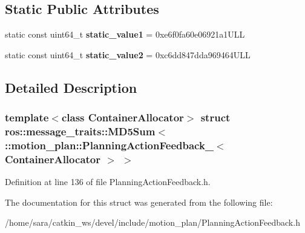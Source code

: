 \subsection*{Static Public Attributes}
\begin{DoxyCompactItemize}
\item 
\mbox{\label{structros_1_1message__traits_1_1MD5Sum_3_01_1_1motion__plan_1_1PlanningActionFeedback___3_01ContainerAllocator_01_4_01_4_a2917988d8db2eae40ac3e131e1578331}} 
static const uint64\+\_\+t {\bfseries static\+\_\+value1} = 0xe6f0fa60e06921a1\+U\+LL
\item 
\mbox{\label{structros_1_1message__traits_1_1MD5Sum_3_01_1_1motion__plan_1_1PlanningActionFeedback___3_01ContainerAllocator_01_4_01_4_a125222966262b7d71c6dc44e0a1192fc}} 
static const uint64\+\_\+t {\bfseries static\+\_\+value2} = 0xc6dd847dda969464\+U\+LL
\end{DoxyCompactItemize}


\subsection{Detailed Description}
\subsubsection*{template$<$class Container\+Allocator$>$\newline
struct ros\+::message\+\_\+traits\+::\+M\+D5\+Sum$<$ \+::motion\+\_\+plan\+::\+Planning\+Action\+Feedback\+\_\+$<$ Container\+Allocator $>$ $>$}



Definition at line 136 of file Planning\+Action\+Feedback.\+h.



The documentation for this struct was generated from the following file\+:\begin{DoxyCompactItemize}
\item 
/home/sara/catkin\+\_\+ws/devel/include/motion\+\_\+plan/Planning\+Action\+Feedback.\+h\end{DoxyCompactItemize}
